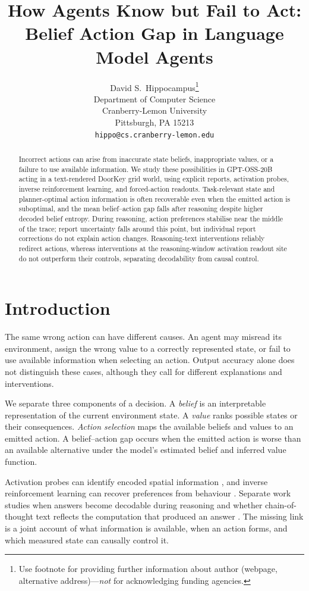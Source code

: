 \documentclass{article}
\title{How Agents Know but Fail to Act:\\ Belief Action Gap in Language Model Agents}
\author{%
  David S.~Hippocampus\thanks{Use footnote for providing further information
    about author (webpage, alternative address)---\emph{not} for acknowledging
    funding agencies.} \\
  Department of Computer Science\\
  Cranberry-Lemon University\\
  Pittsburgh, PA 15213 \\
  \texttt{hippo@cs.cranberry-lemon.edu} \\
}
\begin{document}
\maketitle


\begin{abstract}
Incorrect actions can arise from inaccurate state beliefs, inappropriate values, or a failure to use available information. We study these possibilities in GPT-OSS-20B acting in a text-rendered DoorKey grid world, using explicit reports, activation probes, inverse reinforcement learning, and forced-action readouts. Task-relevant state and planner-optimal action information is often recoverable even when the emitted action is suboptimal, and the mean belief--action gap falls after reasoning despite higher decoded belief entropy. During reasoning, action preferences stabilise near the middle of the trace; report uncertainty falls around this point, but individual report corrections do not explain action changes. Reasoning-text interventions reliably redirect actions, whereas interventions at the reasoning-window activation readout site do not outperform their controls, separating decodability from causal control.
\end{abstract}


\section{Introduction}

The same wrong action can have different causes. An agent may misread its environment, assign the wrong value to a correctly represented state, or fail to use available information when selecting an action. Output accuracy alone does not distinguish these cases, although they call for different explanations and interventions.

We separate three components of a decision. A \emph{belief} is an interpretable representation of the current environment state. A \emph{value} ranks possible states or their consequences. \emph{Action selection} maps the available beliefs and values to an emitted action. A belief--action gap occurs when the emitted action is worse than an available alternative under the model's estimated belief and inferred value function.

Activation probes can identify encoded spatial information \cite{li2023emergent,nanda-etal-2023-emergent,gurnee2024language,arghal2026behavioural}, and inverse reinforcement learning can recover preferences from behaviour \cite{ng2000algorithms,ziebartMaximumEntropyInverse2008a}. Separate work studies when answers become decodable during reasoning and whether chain-of-thought text reflects the computation that produced an answer \cite{pal-etal-2023-future,dong2025emergent,lanham2023measuring}. The missing link is a joint account of what information is available, when an action forms, and which measured state can causally control it.
\end{document}
